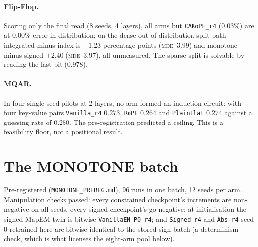 \documentclass[10pt]{article}
\newcommand{\mde}{\textsc{mde}}
\newcommand{\arm}[1]{\texttt{#1}}
\begin{document}
\paragraph{Flip-Flop.} Scoring only the final read (8 seeds, 4 layers), all arms but \arm{CARoPE\_r4} ($0.03\%$) are at $0.00\%$ error in
distribution; on the dense out-of-distribution split path-integrated minus index is $-1.23$ percentage points
(\mde\ $3.99$) and monotone minus signed $+2.40$ (\mde\ $3.97$), all unmeasured. The sparse split is solvable by
reading the last bit ($0.978$). %

\paragraph{MQAR.} In four single-seed pilots at 2 layers, no arm formed an induction circuit: with four key-value
pairs \arm{Vanilla\_r4} $0.273$, \arm{RoPE} $0.264$ and \arm{PlainFlat} $0.274$ against a guessing rate of $0.250$.
The pre-registration predicted a ceiling. This is a feasibility floor, not a positional result.

\section{The MONOTONE batch}
\label{app:monotone}

Pre-registered (\texttt{MONOTONE\_PREREG.md}), 96 runs in one batch, 12 seeds per arm. Manipulation checks
passed: every constrained checkpoint's increments are non-negative on all seeds, every signed checkpoint's go
negative; at initialisation the signed MapEM twin is bitwise \arm{VanillaEM\_P0\_r4}; and \arm{Signed\_r4} and
\arm{Abs\_r4} seed 0 retrained here are bitwise identical to the stored sign batch (a determinism check, which is
what licenses the eight-arm pool below). %
\end{document}

